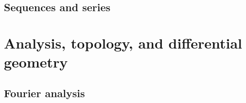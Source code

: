 \documentclass[a4paper,makeidx]{book}
\begin{document}
			
			
			
			
			
			




		\chapter{Sequences and series}

			

	\part{Analysis, topology, and differential geometry}

		\chapter{Fourier analysis}

			



\end{document}
